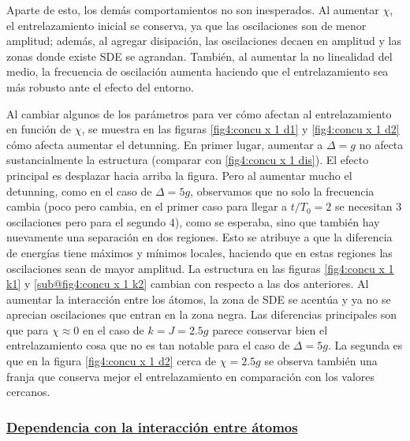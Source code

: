 Aparte de esto, los demás comportamientos no son inesperados. Al aumentar $\chi$, el entrelazamiento inicial se conserva, ya que las oscilaciones son de menor amplitud; además, al agregar disipación, las oscilaciones decaen en amplitud y las zonas donde existe SDE se agrandan. También, al aumentar la no linealidad del medio, la frecuencia de oscilación aumenta haciendo que el entrelazamiento sea más robusto ante el efecto del entorno.

Al cambiar algunos de los parámetros para ver cómo afectan al entrelazamiento en función de $\chi$, se muestra en las figuras \ref{fig4:concu x 1 d1} y \ref{fig4:concu x 1 d2} cómo afecta aumentar el detunning. En primer lugar, aumentar a $\Delta=g$ no afecta sustancialmente la estructura (comparar con \ref{fig4:concu x 1 dis}). El efecto principal es desplazar hacia arriba la figura. Pero al aumentar mucho el detunning, como en el caso de $\Delta=5g$, observamos que no solo la frecuencia cambia (poco pero cambia, en el primer caso para llegar a $t/T_0=2$ se necesitan 3 oscilaciones pero para el segundo 4), como se esperaba, sino que también hay nuevamente una separación en dos regiones. Esto se atribuye a que la diferencia de energías tiene máximos y mínimos locales, haciendo que en estas regiones las oscilaciones sean de mayor amplitud. La estructura en las figuras \ref{fig4:concu x 1 k1} y \ref{sub@fig4:concu x 1 k2} cambian con respecto a las dos anteriores. Al aumentar la interacción entre los átomos, la zona de SDE se acentúa y ya no se aprecian oscilaciones que entran en la zona negra. Las diferencias principales son que para $\chi \approx 0$ en el caso de $k=J=2.5g$ parece conservar bien el entrelazamiento cosa que no es tan notable para el caso de $\Delta=5g$. La segunda es que en la figura \ref{fig4:concu x 1 d2} cerca de $\chi=2.5g$ se observa también una franja que conserva mejor el entrelazamiento en comparación con los valores cercanos.

\subsubsection{\underline{Dependencia con la interacción entre átomos}}

